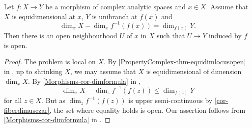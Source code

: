 \begin{corollary}\label{cor-dimforopenspread}
    Let $f:X\rightarrow Y$ be a morphism of complex analytic spaces and $x\in X$. Assume that $X$ is equidimensional at $x$, $Y$ is unibranch at $f(x)$ and
    \[
        \dim_x X-\dim_x f^{-1}(f(x))= \dim_{f(x)}Y.
    \] 
    Then there is an open neighbourhood $U$ of $x$ in $X$ such that $U\rightarrow Y$ induced by $f$ is open.
\end{corollary}
\begin{proof}
    The problem is local on $X$. By \cref{PropertyComplex-thm-equidimlocusopen} in , up to shrinking $X$, we may assume that $X$ is equidimensional of dimension $\dim_x X$. By \cref{Morphisms-cor-dimformula}  in , 
    \[
        \dim_x X-\dim_z f^{-1}(f(z))\leq \dim_{f(z)}Y
    \] 
    for all $z\in X$. But as $\dim_z f^{-1}(f(z))$ is upper semi-continuous by \cref{cor-fiberdimusczar}, the set where equality holds is open. Our assertion follows from \cref{Morphisms-cor-dimformula}  in .
\end{proof}

